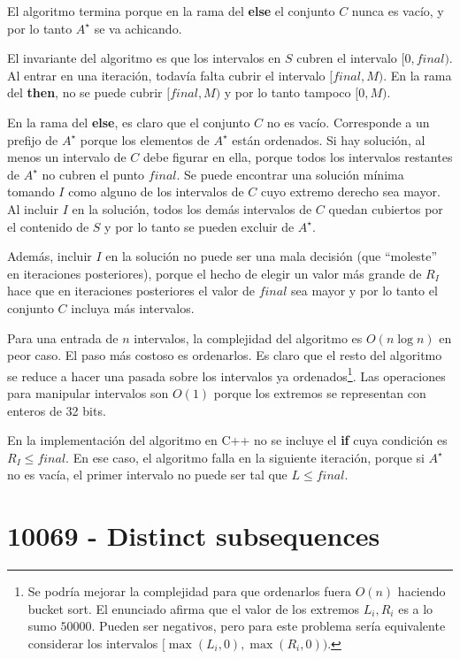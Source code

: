 \documentclass[10pt,a4paper,notitlepage]{article}
\begin{document}
El algoritmo termina porque en la rama del {\bf else}
el conjunto $C$ nunca es vac\'io, y por lo tanto $A^\star$
se va achicando.

El invariante del algoritmo es que los intervalos en $S$ cubren el
intervalo $[0,final)$.
Al entrar en una iteraci\'on, todav\'ia falta cubrir el intervalo
$[final, M)$. En la rama del {\bf then}, no se puede cubrir
$[final, M)$ y por lo tanto tampoco $[0,M)$.

En la rama del {\bf else}, es claro que el conjunto $C$ no es vac\'io.
Corresponde a un prefijo de $A^\star$ porque los elementos de $A^\star$
est\'an ordenados. Si hay soluci\'on, al menos un intervalo de $C$ debe
figurar en ella, porque todos los intervalos restantes de $A^\star$ no
cubren el punto $final$. Se puede encontrar una soluci\'on m\'inima
tomando $I$ como alguno de los intervalos de $C$ cuyo extremo
derecho sea mayor.
Al incluir $I$ en la soluci\'on, todos los dem\'as intervalos
de $C$ quedan cubiertos por el contenido de $S$ y por lo tanto
se pueden excluir de $A^\star$.

Adem\'as, incluir $I$ en la soluci\'on no puede ser una mala
decisi\'on (que ``moleste'' en iteraciones posteriores), porque
el hecho de elegir un valor m\'as grande de $R_I$ hace que
en iteraciones posteriores el valor de $final$ sea mayor y
por lo tanto el conjunto $C$ incluya m\'as intervalos.

Para una entrada de $n$ intervalos, la complejidad del algoritmo
es $O(n \log n)$ en peor caso. El paso m\'as costoso es ordenarlos.
Es claro que el resto del algoritmo se reduce a
hacer una pasada sobre los intervalos ya ordenados\footnote{
Se podr\'ia mejorar la complejidad para que ordenarlos
fuera $O(n)$ haciendo bucket sort. El enunciado afirma que el valor
de los extremos $L_i, R_i$ es a lo sumo $50000$. Pueden ser negativos,
pero para este problema ser\'ia equivalente considerar los
intervalos $[\max(L_i,0),\max(R_i,0))$.
}.
Las operaciones para manipular intervalos son $O(1)$ porque
los extremos se representan con enteros de 32 bits.

En la implementaci\'on del algoritmo en C++ no se incluye el {\bf if}
cuya condici\'on es $R_I \leq final$. En ese caso, el
algoritmo falla en la siguiente iteraci\'on, porque si
$A^\star$ no es vac\'ia, el primer intervalo no puede ser
tal que $L \leq final$.

\section{10069 - Distinct subsequences}
\end{document}
